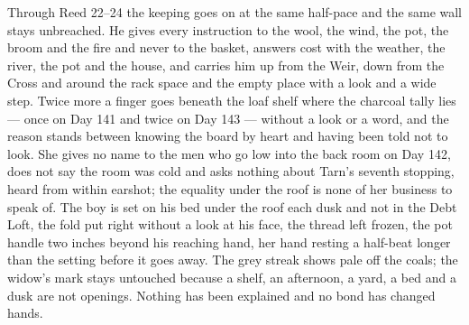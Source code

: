 \documentclass{design/chronicle}
\begin{document}
{Through Reed 22–24 the keeping goes on at the same half-pace and the same wall stays unbreached. He gives every instruction to the wool, the wind, the pot, the broom and the fire and never to the basket, answers cost with the weather, the river, the pot and the house, and carries him up from the Weir, down from the Cross and around the rack space and the empty place with a look and a wide step. Twice more a finger goes beneath the loaf shelf where the charcoal tally lies — once on Day 141 and twice on Day 143 — without a look or a word, and the reason stands between knowing the board by heart and having been told not to look. She gives no name to the men who go low into the back room on Day 142, does not say the room was cold and asks nothing about Tarn’s seventh stopping, heard from within earshot; the equality under the roof is none of her business to speak of. The boy is set on his bed under the roof each dusk and not in the Debt Loft, the fold put right without a look at his face, the thread left frozen, the pot handle two inches beyond his reaching hand, her hand resting a half-beat longer than the setting before it goes away. The grey streak shows pale off the coals; the widow’s mark stays untouched because a shelf, an afternoon, a yard, a bed and a dusk are not openings. Nothing has been explained and no bond has changed hands.

}
\end{document}
